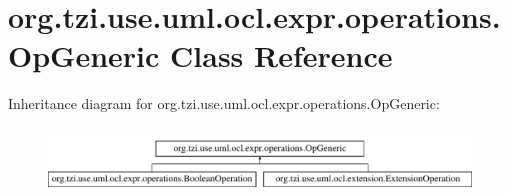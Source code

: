 \hypertarget{classorg_1_1tzi_1_1use_1_1uml_1_1ocl_1_1expr_1_1operations_1_1_op_generic}{\section{org.\-tzi.\-use.\-uml.\-ocl.\-expr.\-operations.\-Op\-Generic Class Reference}
\label{classorg_1_1tzi_1_1use_1_1uml_1_1ocl_1_1expr_1_1operations_1_1_op_generic}
}
Inheritance diagram for org.\-tzi.\-use.\-uml.\-ocl.\-expr.\-operations.\-Op\-Generic\-:\begin{figure}[H]
\begin{center}
\leavevmode
\includegraphics[height=1.744548cm]{classorg_1_1tzi_1_1use_1_1uml_1_1ocl_1_1expr_1_1operations_1_1_op_generic}
\end{center}
\end{figure}
